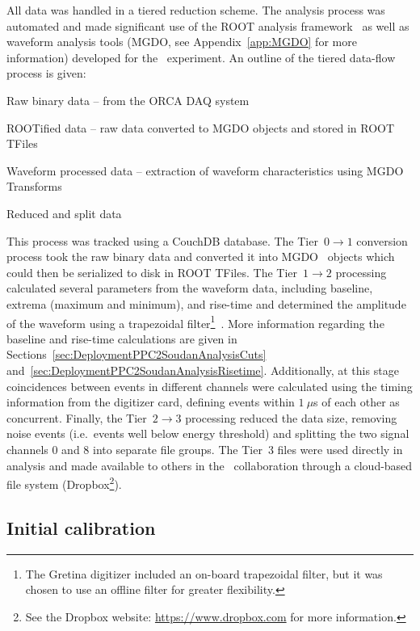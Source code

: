 	All data was handled in a tiered reduction scheme.  The analysis process was automated and made significant use of the ROOT analysis framework~\cite{Bru97} as well as waveform analysis tools (MGDO, see Appendix~\ref{app:MGDO} for more information) developed for the \MJ~experiment.  An outline of the tiered data-flow process is given:
		\begin{description}\itemsep2pt
			\item[Tier 0:]  Raw binary data -- from the ORCA DAQ system
			\item[Tier 1:]  ROOTified data -- raw data converted to MGDO objects and stored in ROOT TFiles
			\item[Tier 2:]  Waveform processed data -- extraction of waveform characteristics using MGDO Transforms
			\item[Tier 3:]  Reduced and split data
		\end{description}	
		
	This process was tracked using a CouchDB database.  The Tier~$0\to1$ conversion process took the raw binary data and converted it into MGDO \cpp~objects which could then be serialized to disk in ROOT TFiles.  The Tier~$1\to2$ processing calculated several parameters from the waveform data, including baseline, extrema (maximum and minimum), and rise-time and determined the amplitude of the waveform using a trapezoidal filter\footnote{The Gretina digitizer included an on-board trapezoidal filter, but it was chosen to use an offline filter for greater flexibility.}~\cite{Jor94}.  More information regarding the baseline and rise-time calculations are given in Sections~\ref{sec:DeploymentPPC2SoudanAnalysisCuts} and~\ref{sec:DeploymentPPC2SoudanAnalysisRisetime}.  Additionally, at this stage coincidences between events in different channels were calculated using the timing information from the digitizer card, defining events within $1~\mu$s of each other as concurrent.   Finally, the Tier~$2\to3$ processing reduced the data size, removing noise events (i.e.~events well below energy threshold) and splitting the two signal channels 0 and 8 into separate file groups.  The Tier~3 files were used directly in analysis and made available to others in the \MJ~collaboration through a cloud-based file system (Dropbox\footnote{See the Dropbox website: \url{https://www.dropbox.com} for more information.}).
	
		\subsection{Initial calibration}
		\label{sec:DeploymentPPC2SoudanAnalysisCalibration}    
			
